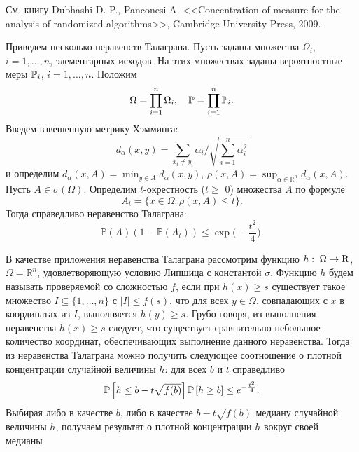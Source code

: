 \begin{remark}
См. книгу Dubhashi D. P., Panconesi A. <<Concentration of measure for the analysis of randomized algorithms>>, Cambridge University Press, 2009.

Приведем несколько неравенств Талаграна. Пусть заданы множества $\Omega_i$, $i=1,\dots,n$, элементарных исходов. На этих множествах заданы вероятностные меры $\mathrm{{\mathbb P}}_i$, $i=1,\dots,n$. Положим 
\begin{equation*}
\Omega= \prod_{i=1}^n\Omega_i,\quad \mathrm{{\mathbb P}} = \prod_{i=1}^n \mathrm{{\mathbb P}}_i.
\end{equation*}
Введем взвешенную метрику Хэмминга:
\begin{equation*}
d_{\alpha}(x,y) = \sum_{x_i\not = y_i} \alpha_i \biggr/ \sqrt{\sum_{i=1}^n \alpha^2_i}
\end{equation*}
и определим $d_{\alpha}(x,A) = \min_{y\in A} d_{\alpha}(x,y)$, $\rho(x,A) = \sup_{\alpha\in \mathbb{R}^n} d_{\alpha}(x,A)$. Пусть $A \in \sigma(\Omega)$. Определим $t$-окрестность ($t\geq$ 0) множества $A$ по формуле 
\begin{equation*}
A_t = \{x\in\Omega: \rho (x,A)\leq t\}.
\end{equation*}
Тогда справедливо неравенство Талаграна:
\begin{equation*}
\mathbb{P}(A)(1-\mathbb{P}(A_t))\leq \exp\biggl(-\frac{t^2}{4}\biggr).
\end{equation*}
\begin{suite}

В качестве приложения неравенства Талаграна рассмотрим функцию $h:\; \Omega \to {\rm R}$, $\Omega = \mathbb{R}^n$, удовлетворяющую условию Липшица с константой $\sigma$. Функцию $h$ будем называть проверяемой со сложностью $f$, если при $h(x)\ge s$ существует такое множество $I\subseteq \{1,\ldots ,n\}$ с $\vert I\vert \le f(s)$, что для всех $y\in \Omega $, совпадающих с $x$ в координатах из $I$, выполняется $h(y)\ge s$. Грубо говоря, из выполнения неравенства $h(x)\ge s$ следует, что существует сравнительно небольшое количество 
координат, обеспечивающих выполнение данного неравенства. Тогда из 
неравенства Талаграна можно получить следующее соотношение о плотной 
концентрации случайной величины $h$: для всех $b$ и $t$ 
справедливо 
\[
\mathrm{{\mathbb P}}\left[ {h\le b-t\sqrt {f(b)} } \right]\mathrm{{\mathbb P}}\left[ {h\ge b} \right]\le 
e^{-\frac{t^2}{4}}.
\]
Выбирая либо в качестве $b$, либо в качестве $b-t\sqrt {f(b)} $ медиану случайной величины $h$, получаем результат о плотной концентрации $h$ вокруг своей медианы


\end{suite}
\end{remark}
